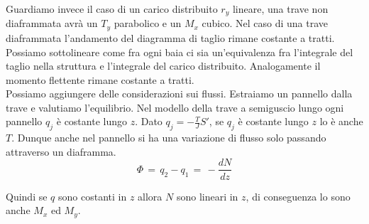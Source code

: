 Guardiamo invece il caso di un carico distribuito $r_y$ lineare, una trave non diaframmata avrà un $T_y$ parabolico e un $M_x$ cubico.
Nel caso di una trave diaframmata l'andamento del diagramma di taglio rimane costante a tratti. Possiamo sottolineare come fra ogni baia ci sia un'equivalenza fra l'integrale del taglio nella struttura e l'integrale del carico distribuito. Analogamente il momento flettente rimane costante a tratti.\\

Possiamo aggiungere delle considerazioni sui flussi. Estraiamo un pannello dalla trave e valutiamo l'equilibrio. Nel modello della trave a semiguscio lungo ogni pannello $q_j$ è costante lungo $z$. Dato $q_j=-\frac{T}{J}S'$, se $q_j$ è costante lungo $z$ lo è anche $T$. Dunque anche nel pannello si ha una variazione di flusso solo passando attraverso un diaframma.
\begin{equation*}
    \Phi\,=\, q_2-q_1\,=\,  -\frac{dN}{dz}
\end{equation*}

Quindi se $q$ sono costanti in $z$ allora $N$ sono lineari in $z$, di conseguenza lo sono anche $M_x$ ed $M_y$.